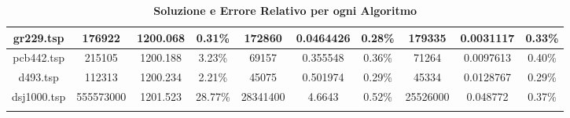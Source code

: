 \begin{longtable}{|c|c|c|c|c|c|c|c|c|c|}
gr229.tsp        & 176922             & 1200.068           & 0.31\%          & 172860             & 0.0464426          & 0.28\%          & 179335             & 0.0031117          & 0.33\%          \\ \hline
pcb442.tsp       & 215105             & 1200.188           & 3.23\%          & 69157              & 0.355548           & 0.36\%          & 71264              & 0.0097613          & 0.40\%          \\ \hline
d493.tsp         & 112313             & 1200.234           & 2.21\%          & 45075              & 0.501974           & 0.29\%          & 45334              & 0.0128767          & 0.29\%          \\ \hline
dsj1000.tsp      & 555573000          & 1201.523           & 28.77\%         & 28341400           & 4.6643             & 0.52\%          & 25526000           & 0.048772           & 0.37\%          \\ \hline
\caption{\textbf{Soluzione e Errore Relativo per ogni Algoritmo}}
\end{longtable}